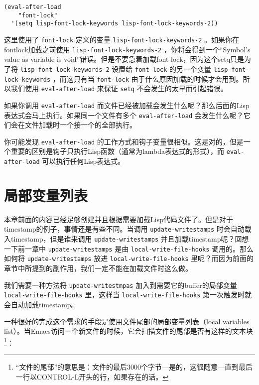 \begin{verbatim}
(eval-after-load
    "font-lock"
  '(setq lisp-font-lock-keywords lisp-font-lock-keywords-2))
\end{verbatim}

这里使用了 \texttt{font-lock} 定义的变量 \texttt{lisp-font-lock-keywords-2} 。如果你在fontlock加载之前使用 \texttt{lisp-font-lock-keywords-2} ，你将会得到一个“Symbol's value as variable is void”错误。但是不要急着加载font-lock，因为这个setq只是为了将 \texttt{lisp-font-lock-keywords-2} 设置给 \texttt{font-lock} 的另一个变量 \texttt{lisp-font-lock-keywords} ，而这只有当 \texttt{font-lock} 由于什么原因加载的时候才会用到。所以我们使用 \texttt{eval-after-load} 来保证 \texttt{setq} 不会发生的太早而引起错误。

如果你调用 \texttt{eval-after-load} 而文件已经被加载会发生什么呢？那么后面的Lisp表达式会马上执行。如果同一个文件有多个 \texttt{eval-after-load} 会发生什么呢？它们会在文件加载时一个接一个的全部执行。

你可能发现 \texttt{eval-after-load} 的工作方式和钩子变量很相似。这是对的，但是一个重要的区别是钩子只执行Lisp函数（通常为lambda表达式的形式），而 \texttt{eval-after-load} 可以执行任何Lisp表达式。

\section{局部变量列表}
\label{section:05-Local-Variables-Lists}

本章前面的内容已经足够创建并且根据需要加载Lisp代码文件了。但是对于timestamp的例子，事情还是有些不同。当调用 \texttt{update-writestamps} 时会自动载入timestamp，但是谁来调用 \texttt{update-writestamps} 并且加载timestamp呢？回想一下前一章中 \texttt{update-writestamps} 是由 \texttt{local-write-file-hooks} 调用的。那么如何将 \texttt{update-writestamps} 放进 \texttt{local-write-file-hooks} 里呢？而因为前面的章节中所提到的副作用，我们一定不能在加载文件时这么做。

我们需要一种方法将 \texttt{update-writestmpas} 加入到需要它的buffer的局部变量 \texttt{local-write-file-hooks} 里，这样当 \texttt{local-write-file-hooks} 第一次触发时就会自动加载timestamp。

一种很好的完成这个需求的手段是使用文件尾部的局部变量列表（local variables list）。当Emacs访问一个新文件的时候，它会扫描文件的尾部是否有这样的文本块\footnote{“文件的尾部”的意思是：文件的最后3000个字节---是的，这很随意---直到最后一行以CONTROL-L开头的行，如果存在的话。}：

